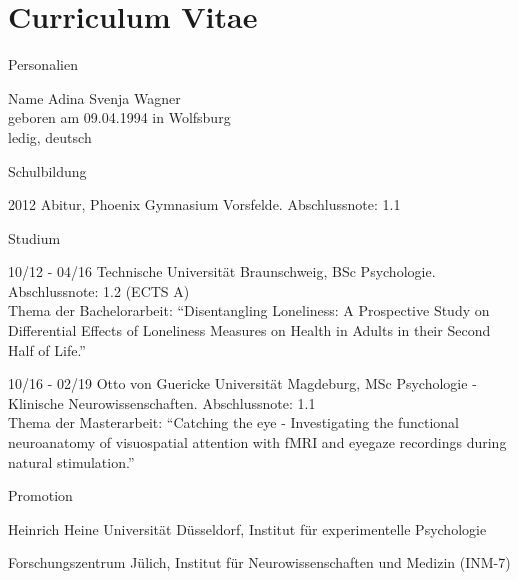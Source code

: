 
\chapter{Curriculum Vitae}


\begin{cv}{}
\begin{cvlist}{Personalien}
	\item[Name]
		Adina Svenja Wagner \\
		geboren am 09.04.1994 in Wolfsburg \\
		ledig, deutsch
\end{cvlist}
%
\begin{cvlist}{Schulbildung}
	\item[2012] Abitur, Phoenix Gymnasium Vorsfelde. Abschlussnote: 1.1
\end{cvlist}
%
\begin{cvlist}{Studium}
	\item[10/12 - 04/16] Technische Universität Braunschweig, BSc Psychologie. Abschlussnote: 1.2 (ECTS A)
	\\[0.5\baselineskip]
    Thema der Bachelorarbeit: \enquote{Disentangling Loneliness: A Prospective Study on Differential Effects of
	Loneliness Measures on Health in Adults in their Second Half of Life.}
	\item[10/16 - 02/19] Otto von Guericke Universität Magdeburg, MSc Psychologie - Klinische Neurowissenschaften. Abschlussnote: 1.1 
	\\[0.5\baselineskip]
	Thema der Masterarbeit: \enquote{Catching the eye - Investigating the functional neuroanatomy of visuospatial
	attention with fMRI and eyegaze recordings during natural stimulation.}
\end{cvlist}
%
\begin{cvlist}{Promotion}
	\item Heinrich Heine Universität Düsseldorf, Institut für experimentelle Psychologie
	\item Forschungszentrum Jülich, Institut für Neurowissenschaften und Medizin (INM-7)
\end{cvlist}

\end{cv}
